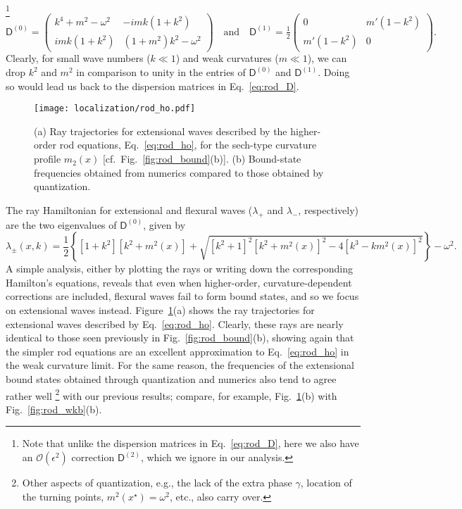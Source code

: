 \footnote{Note that unlike the dispersion matrices in Eq.~\eqref{eq:rod_D}, here we also have an $\mathcal{O}(\epsilon^{2})$ correction $\mathsf{D}^{(2)}$, which we ignore in our analysis.}
%
\begin{equation}
  \mathsf{D}^{(0)}
  =
  \begin{pmatrix}
    k^{4} + m^{2} - \omega^{2} & -imk(1 + k^{2})\\
    imk(1 + k^{2}) & (1+m^{2})k^{2} - \omega^{2}
  \end{pmatrix}
  \quad\text{and}\quad
  \mathsf{D}^{(1)}
  =
  \tfrac{1}{2}
  \begin{pmatrix}
    0 & m'(1-k^{2})\\
    m'(1-k^{2}) & 0
  \end{pmatrix}.
\end{equation}
%
Clearly, for small wave numbers ($k \ll 1$) and weak curvatures ($m \ll 1$), we can drop $k^{2}$ and $m^{2}$ in comparison to unity in the entries of $\mathsf{D}^{(0)}$ and $\mathsf{D}^{(1)}$.
Doing so would lead us back to the dispersion matrices in Eq.~\eqref{eq:rod_D}.
%
\begin{figure}
  \begin{center}
    \texttt{[image: localization/rod\_ho.pdf]}
  \end{center}
  \caption{(a) Ray trajectories for extensional waves described by the higher-order rod equations, Eq.~\eqref{eq:rod_ho}, for the sech-type curvature profile $m_{2}(x)$ [cf.~Fig.~\ref{fig:rod_bound}(b)]. (b) Bound-state frequencies obtained from numerics compared to those obtained by quantization.}
  \label{fig:rod_ho}
\end{figure}

The ray Hamiltonian for extensional and flexural waves ($\lambda_{+}$ and $\lambda_{-}$, respectively) are the two eigenvalues of $\mathsf{D}^{(0)}$, given by
%
\begin{equation}
  \lambda_{\pm}(x, k) = \frac{1}{2} \left\{\left[1 + k^2\right] \left[k^2+m^{2}(x)\right]+\sqrt{\left[k^2+1\right]^2 \left[k^2+m^{2}(x)\right]^2-4 \left[k^3-k m^{2}(x)\right]^2}\right\} - \omega^{2}.
\end{equation}
%
A simple analysis, either by plotting the rays or writing down the corresponding Hamilton's equations, reveals that even when higher-order, curvature-dependent corrections are included, flexural waves fail to form bound states, and so we focus on extensional waves instead.
Figure~\ref{fig:rod_ho}(a) shows the ray trajectories for extensional waves described by Eq.~\eqref{eq:rod_ho}.
Clearly, these rays are nearly identical to those seen previously in Fig.~\ref{fig:rod_bound}(b), showing again that the simpler rod equations are an excellent approximation to Eq.~\eqref{eq:rod_ho} in the weak curvature limit.
For the same reason, the frequencies of the extensional bound states obtained through quantization and numerics also tend to agree rather well%
\footnote{Other aspects of quantization, e.g., the lack of the extra phase $\gamma$, location of the turning points, $m^{2}(x^{\star}) = \omega^{2}$, etc., also carry over.}
with our previous results; compare, for example, Fig.~\ref{fig:rod_ho}(b) with Fig.~\ref{fig:rod_wkb}(b).

